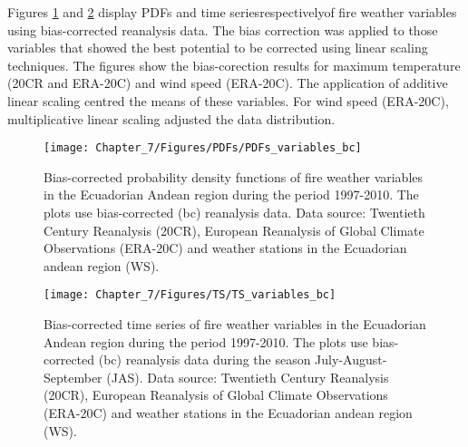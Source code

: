 Figures \ref{fig:Bias-corrected probability density functions of fire weather variables in the Ecuadorian andean region during the period 1997-2010}
and \ref{fig:Bias-corrected time series of fire weather variables in the Ecuadorian andean region during the period 1997-2010}
display PDFs and time series\textemdash respectively\textemdash of
fire weather variables using bias-corrected reanalysis data. The bias
correction was applied to those variables that showed the best potential
to be corrected using linear scaling techniques. The figures show
the bias-corection results for maximum temperature (20CR and ERA-20C)
and wind speed (ERA-20C). The application of additive linear scaling
centred the means of these variables. For wind speed (ERA-20C), multiplicative
linear scaling adjusted the data distribution.

\begin{figure}[h]
\noindent \begin{centering}
\texttt{[image: Chapter\_7/Figures/PDFs/PDFs\_variables\_bc]}
\par\end{centering}

\caption[Bias-corrected probability density functions of fire weather variables
in the Ecuadorian Andean region during the period 1997-2010]{Bias-corrected probability density functions of fire weather variables
in the Ecuadorian Andean region during the period 1997-2010. The plots
use bias-corrected (bc) reanalysis data. Data source: Twentieth Century
Reanalysis (20CR), European Reanalysis of Global Climate Observations
(ERA-20C) and weather stations in the Ecuadorian andean region (WS).\label{fig:Bias-corrected probability density functions of fire weather variables in the Ecuadorian andean region during the period 1997-2010}}
\end{figure}


\begin{figure}[h]
\noindent \begin{centering}
\texttt{[image: Chapter\_7/Figures/TS/TS\_variables\_bc]}
\par\end{centering}

\caption[Bias-corrected time series of fire weather variables in the Ecuadorian
Andean region during the period 1997-2010]{Bias-corrected time series of fire weather variables in the Ecuadorian
Andean region during the period 1997-2010. The plots use bias-corrected
(bc) reanalysis data during the season July-August-September (JAS).
Data source: Twentieth Century Reanalysis (20CR), European Reanalysis
of Global Climate Observations (ERA-20C) and weather stations in the
Ecuadorian andean region (WS). \label{fig:Bias-corrected time series of fire weather variables in the Ecuadorian andean region during the period 1997-2010}}
\end{figure}


